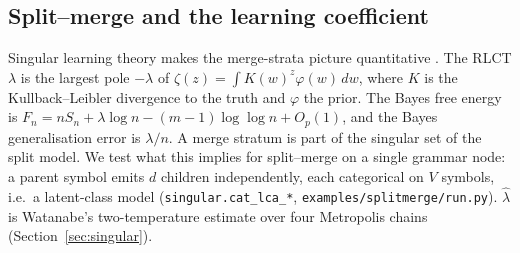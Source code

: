 \documentclass[11pt]{article}
\theoremstyle{definition}
\theoremstyle{remark}
\begin{document}
\subsection{Split--merge and the learning coefficient}\label{sec:splitmerge-rlct}
Singular learning theory makes the merge-strata picture quantitative \cite{watanabe,watanabe18}. The RLCT $\lambda$ is the largest pole $-\lambda$ of $\zeta(z)=\int K(w)^z\varphi(w)\,dw$, where $K$ is the Kullback--Leibler divergence to the truth and $\varphi$ the prior. The Bayes free energy is $F_n=nS_n+\lambda\log n-(m-1)\log\log n+O_p(1)$, and the Bayes generalisation error is $\lambda/n$. A merge stratum is part of the singular set of the split model. We test what this implies for split--merge on a single grammar node: a parent symbol emits $d$ children independently, each categorical on $V$ symbols, i.e.\ a latent-class model (\texttt{singular.cat\_lca\_*}, \texttt{examples/splitmerge/run.py}). $\hat\lambda$ is Watanabe's two-temperature estimate over four Metropolis chains (Section~\ref{sec:singular}).
\end{document}
